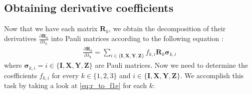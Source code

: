\documentclass{aux/ttuthes2007}
\newcommand{\fpd}[2]{\frac{\partial #1}{\partial #2}}
\begin{document}
\subsection {\textbf{Obtaining derivative coefficients}}
%
Now that we have each matrix $\bm R_k$, we obtain the decomposition of their derivatives $\fpd{\bm R_k}{\lambda_k}$ into Pauli matrices according to the following equation \cite{benjamin}:
%
\begin{equation}\label{eq:r_to_f1e}
\begin{split}
	\fpd{\bm R_k}{\lambda_k} = \sum_{i \in \{\bm I, \bm X, \bm Y, \bm Z\}} f_{k, i} \bm R_k \bm \sigma_{k, i}
\end{split}
\end{equation}
%
where $\bm \sigma_{k, i} = i \in \{\bm I, \bm X, \bm Y, \bm Z\}$ are Pauli matrices.
Now we need to determine the coefficients $f_{k, i}$ for every $k \in \{1, 2, 3\}$ and $i \in \{\bm I, \bm X, \bm Y, \bm Z\}$. We accomplish this task by taking a look at \ref{eq:r_to_f1e} for each $k$:
%
\end{document}
